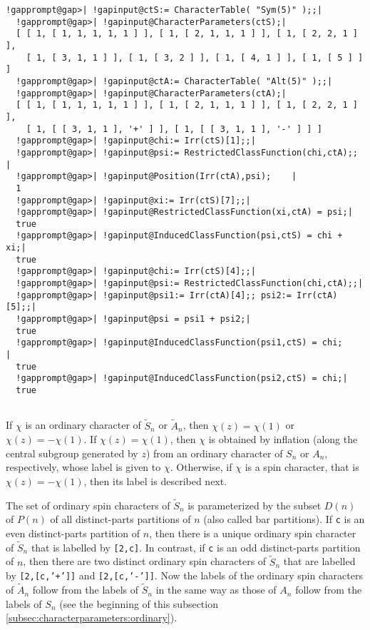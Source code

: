 \documentclass[a4paper,11pt]{report}
\begin{document}
{{{\begin{Verbatim}[commandchars=!@|,fontsize=\small,frame=single,label=Example]
  !gapprompt@gap>| !gapinput@ctS:= CharacterTable( "Sym(5)" );;|
  !gapprompt@gap>| !gapinput@CharacterParameters(ctS);|
  [ [ 1, [ 1, 1, 1, 1, 1 ] ], [ 1, [ 2, 1, 1, 1 ] ], [ 1, [ 2, 2, 1 ] ], 
    [ 1, [ 3, 1, 1 ] ], [ 1, [ 3, 2 ] ], [ 1, [ 4, 1 ] ], [ 1, [ 5 ] ] ]
  !gapprompt@gap>| !gapinput@ctA:= CharacterTable( "Alt(5)" );;|
  !gapprompt@gap>| !gapinput@CharacterParameters(ctA);|
  [ [ 1, [ 1, 1, 1, 1, 1 ] ], [ 1, [ 2, 1, 1, 1 ] ], [ 1, [ 2, 2, 1 ] ], 
    [ 1, [ [ 3, 1, 1 ], '+' ] ], [ 1, [ [ 3, 1, 1 ], '-' ] ] ]
  !gapprompt@gap>| !gapinput@chi:= Irr(ctS)[1];;|
  !gapprompt@gap>| !gapinput@psi:= RestrictedClassFunction(chi,ctA);;           |
  !gapprompt@gap>| !gapinput@Position(Irr(ctA),psi);    |
  1
  !gapprompt@gap>| !gapinput@xi:= Irr(ctS)[7];;|
  !gapprompt@gap>| !gapinput@RestrictedClassFunction(xi,ctA) = psi;|
  true
  !gapprompt@gap>| !gapinput@InducedClassFunction(psi,ctS) = chi + xi;|
  true
  !gapprompt@gap>| !gapinput@chi:= Irr(ctS)[4];;|
  !gapprompt@gap>| !gapinput@psi:= RestrictedClassFunction(chi,ctA);;|
  !gapprompt@gap>| !gapinput@psi1:= Irr(ctA)[4];; psi2:= Irr(ctA)[5];;|
  !gapprompt@gap>| !gapinput@psi = psi1 + psi2;|
  true
  !gapprompt@gap>| !gapinput@InducedClassFunction(psi1,ctS) = chi;              |
  true
  !gapprompt@gap>| !gapinput@InducedClassFunction(psi2,ctS) = chi;|
  true
  
\end{Verbatim}
 If $\chi$ is an ordinary character of  $\tilde{S}_n$ or  $\tilde{A}_n$, then $\chi(z)=\chi(1)$ or $\chi(z)=-\chi(1)$. If $\chi(z)=\chi(1)$, then $\chi$ is obtained by inflation (along the central subgroup generated by $z$) from an ordinary character of $S_n$ or $A_n$, respectively, whose label is given to $\chi$. Otherwise, if $\chi$ is a spin character, that is $\chi(z)=-\chi(1)$, then its label is described next. 

 The set of ordinary spin characters of  $\tilde{S}_n$ is parameterized by the subset $D(n)$ of $P(n)$ of all distinct-parts partitions of $n$ (also called bar partitions). If \texttt{c} is an even distinct-parts partition of $n$, then there is a unique ordinary spin character of  $\tilde{S}_n$ that is labelled by \texttt{[2,c]}. In contrast, if \texttt{c} is an odd distinct-parts partition of $n$, then there are two distinct ordinary spin characters of  $\tilde{S}_n$ that are labelled by \texttt{[2,[c,'+']]} and \texttt{[2,[c,'-']]}. Now the labels of the ordinary spin characters of  $\tilde{A}_n$ follow from the labels of  $\tilde{S}_n$ in the same way as those of $A_n$  follow from the labels of $S_n$  (see the beginning of this subsection \ref{subsec:characterparameters:ordinary}). 
\begin{Verbatim}[commandchars=!@|,fontsize=\small,frame=single,label=Example]
  

\end{Verbatim}}}}
\end{document}
